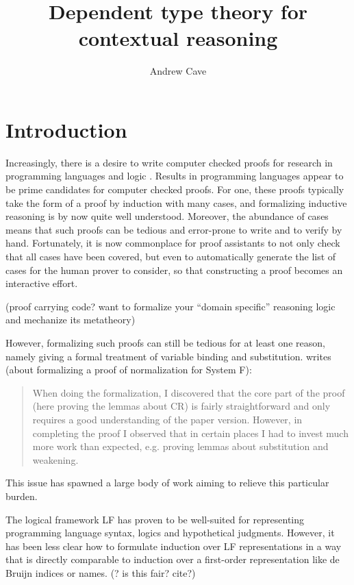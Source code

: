 \documentclass{article}
\author{Andrew Cave}
\title{Dependent type theory for contextual reasoning}
\newcommand{\LONGVERSION}[1]{{\color{light-gray}#1}}
\begin{document}
\maketitle

\section{Introduction}


Increasingly, there is a desire to write computer checked proofs for
research in programming languages and logic
\citep{POPLMark}. Results in programming languages appear to be prime
candidates for computer checked proofs. For one, these proofs typically take the
form of a proof by induction with many cases, and formalizing inductive
reasoning is by now quite well understood. Moreover, the abundance of cases means that such proofs can be
tedious and error-prone to write and to verify by hand. Fortunately, it is now commonplace for proof
assistants to not only check that all cases have been covered, but
even to automatically generate the list of cases for the human prover
to consider, so that constructing a proof becomes an interactive
effort.

\LONGVERSION{(proof carrying code? want to formalize your ``domain specific'' reasoning logic and mechanize
its metatheory)}

However, formalizing such proofs can still be tedious for at least one reason,
namely giving a formal treatment of variable binding and
substitution. \cite{Altenkirch93} writes (about
formalizing a proof of normalization for System F):

\begin{quote}
When doing the formalization, I discovered that the core part of the
proof (here proving the lemmas about CR) is fairly straightforward and
only requires a good understanding of the paper version. However, in
completing the proof I observed that in certain places I had to invest
much more work than expected, e.g. proving lemmas about substitution
and weakening.
\end{quote}

This issue has spawned a large body of work aiming to relieve this
particular burden.

The logical framework LF \citep{Harper93jacm} has proven to be well-suited for representing
programming language syntax, logics and hypothetical
judgments. However, it has been less clear how to formulate induction
over LF representations in a way that is directly comparable to
induction over a first-order representation like de Bruijn indices or
names. (? is this fair? cite?)
\end{document}
